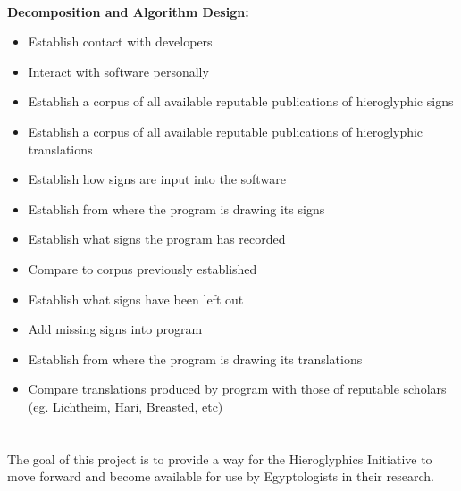 \documentclass{article}
\begin{document}
\paragraph{} \noindent \break
\textbf{Decomposition and Algorithm Design:}
\newline \break
\begin{itemize}  
\item Establish contact with developers
\item Interact with software personally
\item Establish a corpus of all available reputable publications of hieroglyphic signs
\item Establish a corpus of all available reputable publications of hieroglyphic translations
\item Establish how signs are input into the software
\item Establish from where the program is drawing its signs
\item Establish what signs the program has recorded
\item Compare to corpus previously established
\item Establish what signs have been left out
\item Add missing signs into program
\item Establish from where the program is drawing its translations
\item Compare translations produced by program with those of reputable scholars (eg. Lichtheim, Hari, Breasted, etc)
\end{itemize}


\paragraph{} ~\\ \noindent
The goal of this project is to provide a way for the Hieroglyphics Initiative to move forward and become available for use by Egyptologists in their research.
\end{document}
